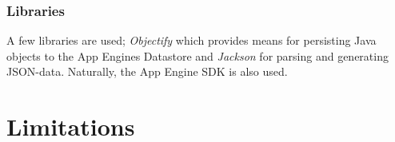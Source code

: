 \subsubsection{Libraries}

A few libraries are used; \emph{Objectify} which provides means for persisting Java objects to the App Engines Datastore
and \emph{Jackson} for parsing and generating JSON-data. Naturally, the App Engine SDK is also used.


\section{Limitations}


